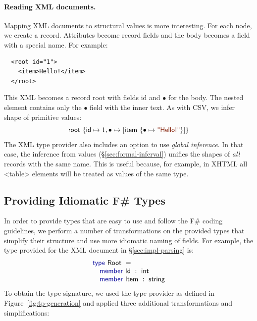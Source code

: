 \documentclass[pldi-cameraready]{sigplanconf-pldi16}
\newcommand{\kvd}[1]{\textnormal{\textcolor{kvdclr}{\sffamily #1}}}
\newcommand{\str}[1]{\textnormal{\textcolor{strclr}{\sffamily "#1"}}}
\newcommand{\ident}[1]{\textnormal{\sffamily #1}}
\begin{document}
\paragraph{Reading XML documents.}
Mapping XML documents to structural values is more interesting. For each node, we
create a record. Attributes become record fields and the body becomes a field with a special
name. For example:
%
{\small{
\begin{verbatim}
  <root id="1">
    <item>Hello!</item>
  </root>
\end{verbatim}
}}
%
\noindent
This XML becomes a record \ident{root} with fields \ident{id} and $\bullet$ for the body.
The nested element contains only the $\bullet$ field with the inner text. As with CSV, we
infer shape of primitive values:
%
\begin{equation*}
\ident{root}~\{ \ident{id} \mapsto 1, \bullet \mapsto [ \ident{item}~\{ \bullet \mapsto \str{Hello!} \}] \}
\end{equation*}
%
The XML type provider also includes an option to use \emph{global inference}. In that case,
the inference from values (\S\ref{sec:formal-inferval}) unifies the shapes of \emph{all} records with the
same name. This is useful because, for example, in XHTML all {\small\ttfamily <table>} elements
will be treated as values of the same type.


\subsection{Providing Idiomatic F\# Types}
\label{sec:impl-naming}

In order to provide types that are easy to use and follow the F\# coding guidelines,
we perform a number of transformations on the provided types that simplify their structure
and use more idiomatic naming of fields. For example, the type provided for the XML document in
\S\ref{sec:impl-parsing} is:
%
\begin{equation*}
\begin{array}{l}
 \kvd{type}~\ident{Root}~=  \\
 \quad \kvd{member}~\ident{Id}~:~\ident{int} \\
 \quad \kvd{member}~\ident{Item}~:~\ident{string}
\end{array}
\end{equation*}
%
To obtain the type signature, we used the type provider as defined in Figure~\ref{fig:tp-generation}
and applied three additional transformations and simplifications:
\end{document}
